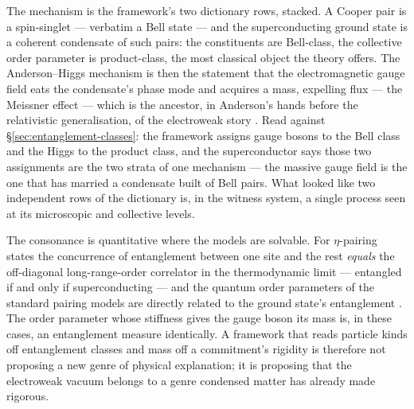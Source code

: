 The mechanism is the framework's two dictionary rows, stacked. A Cooper pair is a spin-singlet ---
verbatim a Bell state --- and the superconducting ground state is a coherent condensate of such
pairs: the constituents are Bell-class, the collective order parameter is product-class, the most
classical object the theory offers. The Anderson--Higgs mechanism is then the statement that the
electromagnetic gauge field eats the condensate's phase mode and acquires a mass, expelling flux
--- the Meissner effect --- which is the ancestor, in Anderson's hands before the relativistic
generalisation, of the electroweak story
\autocite{anderson1963plasmons, poniatowski2019superconductivity}. Read against
\S\ref{sec:entanglement-classes}: the framework assigns gauge bosons to the Bell class and the
Higgs to the product class, and the superconductor says those two assignments are the two strata
of one mechanism --- the massive gauge field is the one that has married a condensate built of
Bell pairs. What looked like two independent rows of the dictionary is, in the witness system, a
single process seen at its microscopic and collective levels.

The consonance is quantitative where the models are solvable. For $\eta$-pairing states the
concurrence of entanglement between one site and the rest \emph{equals} the off-diagonal
long-range-order correlator in the thermodynamic limit --- entangled if and only if
superconducting --- and the quantum order parameters of the standard pairing models are directly
related to the ground state's entanglement \autocite{fanlloyd2005eta}. The order parameter whose
stiffness gives the gauge boson its mass is, in these cases, an entanglement measure identically.
A framework that reads particle kinds off entanglement classes and mass off a commitment's
rigidity is therefore not proposing a new genre of physical explanation; it is proposing that the
electroweak vacuum belongs to a genre condensed matter has already made rigorous.

